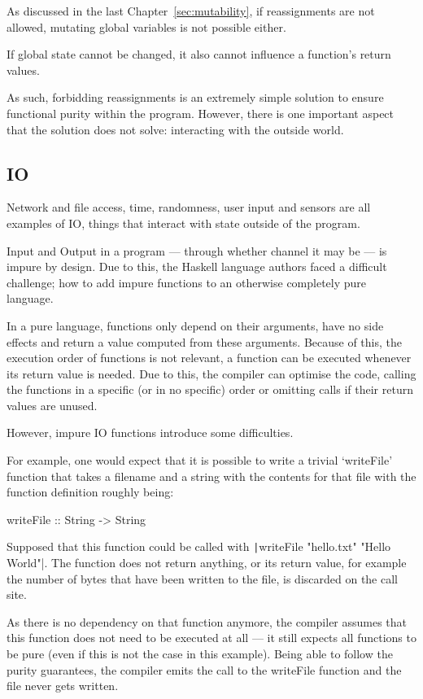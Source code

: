 As discussed in the last Chapter~\ref{sec:mutability}, if reassignments
are not allowed, mutating global variables is not possible either.

If global state cannot be changed, it also cannot influence a function's return values.

As such, forbidding reassignments is an extremely simple solution to
ensure functional purity within the program. However, there is one
important aspect that the solution does not solve: interacting with the outside world.

\subsection{IO}
Network and file access, time, randomness, user input and sensors are all examples
of IO, things that interact with state outside of the program.

Input and Output in a program --- through whether channel it may be --- is
impure by design. Due to this, the Haskell language authors faced a difficult
challenge; how to add impure functions to an otherwise completely pure
language.

In a pure language, functions only depend on their arguments, have
no side effects and return a value computed from these arguments. Because
of this, the execution order of functions is not relevant, a function
can be executed whenever its return value is needed.
Due to this, the compiler can optimise the code, calling the functions
in a specific (or in no specific) order or omitting calls if their return
values are unused.

However, impure IO functions introduce some difficulties.

For example, one would expect that it is possible to write a trivial `writeFile'
function that takes a filename and a string with the contents for that file with
the function definition roughly being:

\begin{haskellcode}
writeFile :: String -> String
\end{haskellcode}
Supposed that this function could be called with
\texttt|writeFile "hello.txt" "Hello World"|. The function
does not return anything, or its return value, for example the number
of bytes that have been written to the file, is discarded on the call site.

As there is no dependency on that function anymore, the compiler assumes that
this function does not need to be executed at all --- it still expects all
functions to be pure (even if this is not the case in this example).
Being able to follow the purity guarantees, the compiler emits the call
to the writeFile function and the file never gets written.

